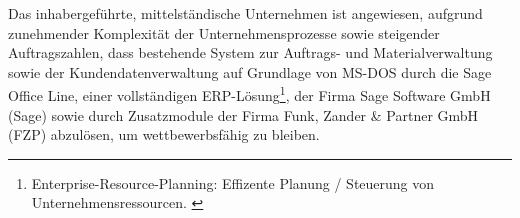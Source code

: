 Das inhabergeführte, mittelständische Unternehmen ist angewiesen, aufgrund zunehmender Komplexität der Unternehmensprozesse sowie steigender Auftragszahlen, dass bestehende System zur Auftrags- und Materialverwaltung sowie der Kundendatenverwaltung auf Grundlage von MS-DOS durch die Sage Office Line, einer vollständigen ERP-Lösung\footnote{\label{foot:1}Enterprise-Resource-Planning: Effizente Planung / Steuerung von Unternehmensressourcen. \cite{ERP}}, der Firma Sage Software GmbH (Sage) sowie durch Zusatzmodule der Firma Funk, Zander \& Partner GmbH (FZP) abzulösen, um wettbewerbsfähig zu bleiben. \cite{einleitung1}